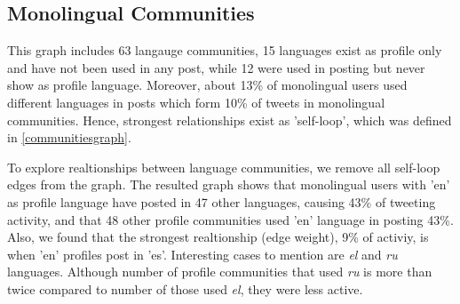 \documentclass{llncs}
\begin{document}

\subsection{Monolingual Communities}

This graph includes 63 langauge communities, 15 languages exist as profile only and
have not been used in any post, while 12 were used in posting but never show as profile
language. Moreover, about 13\% of monolingual users used different languages
in posts which form 10\% of tweets in monolingual communities. Hence, strongest
relationships exist as 'self-loop', which was defined in \ref{communitiesgraph}.

To explore realtionships between language communities, we remove all self-loop 
edges from the graph. The resulted graph shows that monolingual users with 'en' as 
profile language have posted in 47 other languages, causing 43\%
of tweeting activity, and that 48 other profile communities used 'en' language
in posting 43\%. Also, we found that the strongest realtionship (edge weight),
9\% of activiy, is when 'en' profiles post in 'es'. Interesting cases to mention are
\emph{el} and \emph{ru} languages. Although number of profile communities that used \emph{ru}
is more than twice compared to number of those used \emph{el}, they were less 
active.

\end{document}
